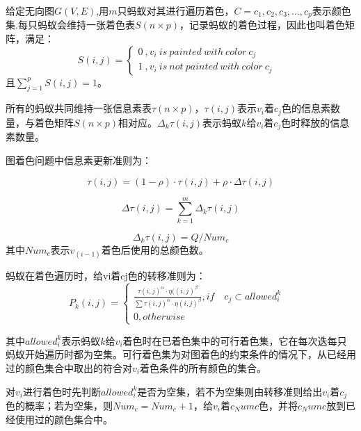 \documentclass[a4paper,12pt]{report}
\begin{document}
\begin{spacing}{1.5}
	给定无向图$G(V, E)$,用$m$只蚂蚁对其进行遍历着色，$C={c_1,c_2,c_3,…,c_p}$表示颜色集.每只蚂蚁会维持一张着色表$S(n \times p)$，记录蚂蚁的着色过程，因此也叫着色矩阵，满足：
	\begin{equation}
		S(i,j) = \left\{  
			\begin{array}{lr}  
			  0\ ,v_i\ is\ painted \ with\ color \ c_j &  \\  
			   1\ , v_i\ is\ not\ painted \ with\ color \ c_j    
			 \end{array}  
			 \right. 
	\end{equation}
	且$\sum_{j=1}^{p}S(i,j)=1$。

	所有的蚂蚁共同维持一张信息素表$\tau (n\times p)$，$\tau (i,j)$表示$v_i$着$c_j$色的信息素数量，与着色矩阵$S(n \times p)$相对应。$\Delta_k \tau (i,j)$表示蚂蚁$k$给$v_i$着$c_j$色时释放的信息素数量。

	图着色问题中信息素更新准则为：

	\begin{equation}
	\tau (i,j)= (1-\rho)\cdot \tau(i,j)+\rho \cdot \Delta \tau(i,j)
	\end{equation}

	\begin{equation}
	\Delta \tau(i,j) = \sum_{k=1}^{m}\Delta_k \tau(i,j)
	\end{equation}

	\begin{equation}
	\Delta_k \tau(i,j) = Q/Num_c
	\end{equation}
	其中$Num_c$表示$v_(i-1)$着色后使用的总颜色数。

	蚂蚁在着色遍历时，给vi着cj色的转移准则为：
	\begin{equation}
		P_k(i,j) = \left\{  
			\begin{array}{lr}  
			  \frac{\tau (i,j)^\alpha \cdot \eta ((i,j)^\beta}{\sum \tau (i,j)^\alpha \cdot \eta (i,j)^\beta},if\quad c_j \subset allowed_i^k &  \\  
			   0, otherwise    
			 \end{array}  
			 \right. 
	\end{equation}

	其中$allowed_i^k$表示蚂蚁$k$给$v_i$着色时在已着色集中的可行着色集，它在每次迭每只蚂蚁开始遍历时都为空集。可行着色集为对图着色的约束条件的情况下，从已经用过的颜色集合中取出的符合对$v_i$着色条件的所有颜色的集合。
	
	对$v_i$进行着色时先判断$allowed_i^k$是否为空集，若不为空集则由转移准则给出$v_i$着$c_j$色的概率；若为空集，则$Num_c= Num_c+1$，给$v_i$着$c_Numc$色，并将$c_Numc$放到已经使用过的颜色集合中。


\end{spacing}
\end{document}
